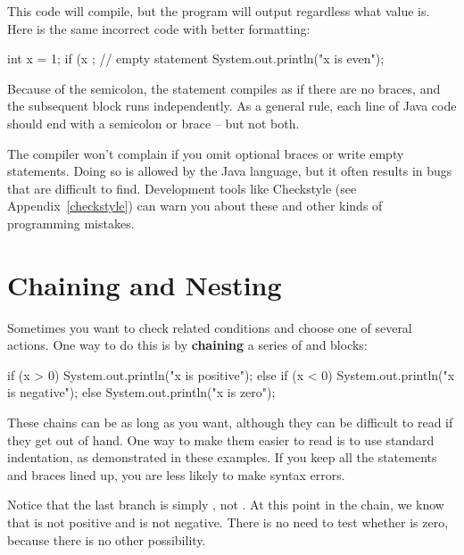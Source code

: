 This code will compile, but the program will output  regardless what value  is.
Here is the same incorrect code with better formatting:

\begin{code}
int x = 1;
if (x %
    ;  // empty statement
{
    System.out.println("x is even");
}
\end{code}

Because of the semicolon, the  statement compiles as if there are no braces, and the subsequent block runs independently.
As a general rule, each line of Java code should end with a semicolon or brace -- but not both.


The compiler won't complain if you omit optional braces or write empty statements.
Doing so is allowed by the Java language, but it often results in bugs that are difficult to find.
Development tools like Checkstyle (see Appendix~\ref{checkstyle}) can warn you about these and other kinds of programming mistakes.


\section{Chaining and Nesting}


Sometimes you want to check related conditions and choose one of several actions.
One way to do this is by {\bf chaining} a series of  and  blocks:

\begin{code}
if (x > 0) {
    System.out.println("x is positive");
} else if (x < 0) {
    System.out.println("x is negative");
} else {
    System.out.println("x is zero");
}
\end{code}

These chains can be as long as you want, although they can be difficult to read if they get out of hand.
One way to make them easier to read is to use standard indentation, as demonstrated in these examples.
If you keep all the statements and braces lined up, you are less likely to make syntax errors.

Notice that the last branch is simply , not .
At this point in the chain, we know that  is not positive and  is not negative.
There is no need to test whether  is zero, because there is no other possibility.

